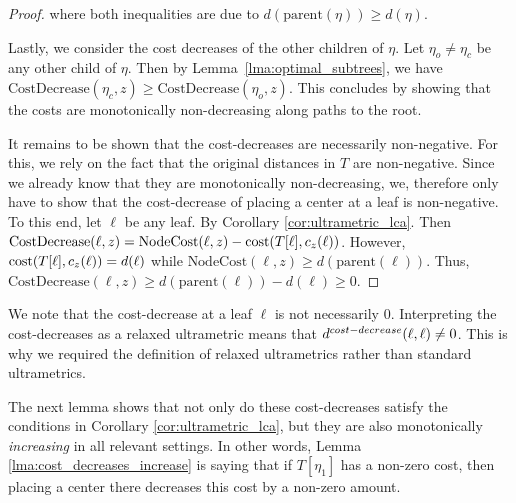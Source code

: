 \begin{proof}
    \noindent where both inequalities are due to $d(\text{parent}(\eta)) \geq d(\eta)$.

    Lastly, we consider the cost decreases of the other children of $\eta$. Let $\eta_o \neq \eta_c$ be any other child of $\eta$.  Then by
    Lemma~\ref{lma:optimal_subtrees}, we have $\text{CostDecrease}(\eta_c, z) \geq \text{CostDecrease}(\eta_o, z)$. This concludes by showing that the costs are monotonically non-decreasing along
    paths to the root.

    It remains to be shown that the cost-decreases are necessarily non-negative. For this, we rely on the fact that the original distances in $T$ are non-negative.
    Since we already know that they are monotonically non-decreasing, we, therefore only have to show that the cost-decrease of placing a center at a leaf is
    non-negative. To this end, let $\ell$ be any leaf. By Corollary \ref{cor:ultrametric_lca}. Then $\text{CostDecrease}(\ell, z) = \text{NodeCost}(\ell, z) - \text{cost}(T[\ell], c_z(\ell))$.
    However, $\text{cost}(T[\ell], c_z(\ell)) = d(\ell)$ while $\text{NodeCost}(\ell, z) \geq d(\text{parent}(\ell))$. Thus, $\text{CostDecrease}(\ell, z) \geq d(\text{parent}(\ell)) - d(\ell)
    \geq 0$.

\end{proof}

\noindent We note that the cost-decrease at a leaf $\ell$ is not necessarily $0$. Interpreting the cost-decreases as a relaxed ultrametric means that
$d^{cost-decrease}(\ell, \ell) \neq 0$. This is why we required the definition of relaxed ultrametrics rather than standard ultrametrics. 

The next lemma shows that not only do these cost-decreases satisfy the conditions in Corollary \ref{cor:ultrametric_lca}, but they are also monotonically
\emph{increasing} in all relevant settings. In other words, Lemma \ref{lma:cost_decreases_increase} is saying that if $T[\eta_1]$ has a non-zero cost, then placing
a center there decreases this cost by a non-zero amount.

